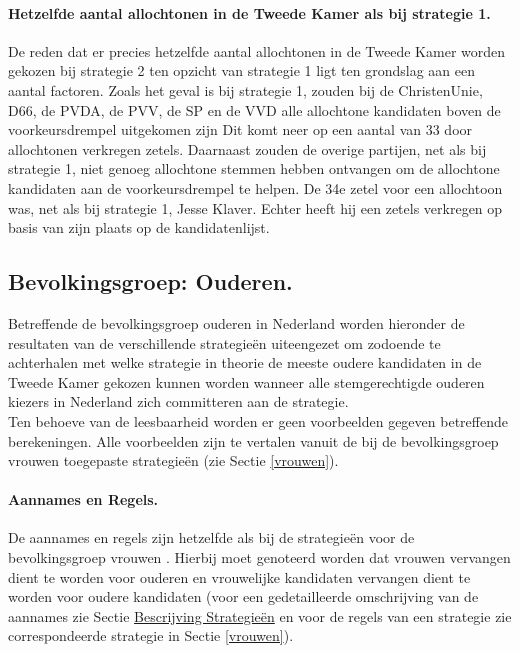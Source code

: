 \paragraph{Hetzelfde aantal allochtonen in de Tweede Kamer als bij strategie 1.}
De reden dat er precies hetzelfde aantal allochtonen in de Tweede Kamer worden gekozen bij strategie 2 ten opzicht van strategie 1 ligt ten grondslag aan een aantal factoren. Zoals het geval is bij strategie 1, zouden bij de ChristenUnie, D66, de PVDA, de PVV, de SP en de VVD alle allochtone kandidaten boven de voorkeursdrempel uitgekomen zijn Dit komt neer op een aantal van 33 door allochtonen verkregen zetels. Daarnaast zouden de overige partijen, net als bij strategie 1, niet genoeg allochtone stemmen hebben ontvangen om de allochtone kandidaten aan de voorkeursdrempel te helpen. De 34e zetel voor een allochtoon was, net als bij strategie 1, Jesse Klaver. Echter heeft hij een zetels verkregen op basis van zijn plaats op de kandidatenlijst. 



\subsection{Bevolkingsgroep: Ouderen.} \label{ouderen}

Betreffende de bevolkingsgroep ouderen in Nederland worden hieronder de resultaten van de verschillende strategie\"{e}n uiteengezet om zodoende te achterhalen met welke strategie in theorie de meeste oudere kandidaten in de Tweede Kamer gekozen kunnen worden wanneer alle stemgerechtigde ouderen kiezers in Nederland zich committeren aan de strategie.\\
\indent Ten behoeve van de leesbaarheid worden er geen voorbeelden gegeven betreffende berekeningen. Alle voorbeelden zijn te vertalen vanuit de bij de bevolkingsgroep vrouwen toegepaste strategie\"{e}n (zie Sectie \ref{vrouwen}). 

\paragraph{Aannames en Regels.}
De aannames en regels zijn hetzelfde als bij de strategie\"{e}n voor de bevolkingsgroep vrouwen . Hierbij moet genoteerd worden dat vrouwen vervangen dient te worden voor ouderen en vrouwelijke kandidaten vervangen dient te worden voor oudere kandidaten (voor een gedetailleerde omschrijving van de aannames zie Sectie \hyperref[besS]{Bescrijving Strategie\"{e}n} en voor de regels van een strategie zie correspondeerde strategie in Sectie \ref{vrouwen}).

